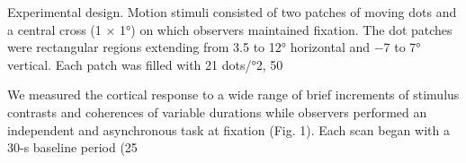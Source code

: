 \documentclass{report}
\begin{document}
Experimental design.
Motion stimuli consisted of two patches of moving dots and a central cross (1 × 1°) on which observers maintained fixation. The dot patches were rectangular regions extending from 3.5 to 12° horizontal and −7 to 7° vertical. Each patch was filled with 21 dots/°2, 50%

We measured the cortical response to a wide range of brief increments of stimulus contrasts and coherences of variable durations while observers performed an independent and asynchronous task at fixation (Fig. 1). Each scan began with a 30-s baseline period (25%
\end{document}
